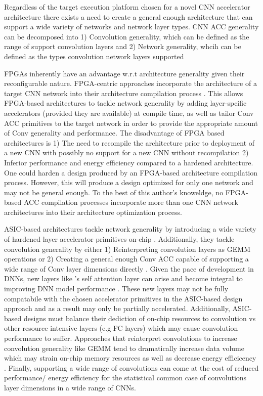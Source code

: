 Regardless of the target execution platform chosen for a novel \ac{CNN}
accelerator architecture there exists a need to create a general enough
architecture that can support a wide variety of networks and network layer
types. \ac{CNN} \ac{ACC} generality can be decomposed into 1) Convolution
generality, which can be defined as the range of support convolution layers and
2) Network generality, whcih can be defined as the types convolution network
layers supported 

\ac{FPGA}s inherently have an advantage w.r.t architecture generality given
their reconfigurable nature. \ac{FPGA}-centric approaches incorporate the
architecture of a target \ac{CNN} network into their architecture compilation
process \cite{caffeine}. This allows \ac{FPGA}-based architectures to tackle
network generality by adding layer-spcific accelerators (provided they are
available) at compile time, as well as tailor \ac{Conv} \ac{ACC} primitives to
the target network in order to provide the appropriate amount of \ac{Conv}
generality and performance. The disadvantage of \ac{FPGA} based architectures is
1) The need to recompile the architecture prior to deployment of a new \ac{CNN}
with possibly no support for a new \ac{CNN} without recompilation 2) Inferior performance and energy
efficiency compared to a hardened architecture. One could harden a design
produced by an \ac{FPGA}-based architecture compilation process. However, this
will produce a design optimized for only one network and may not be general
enough. To the best of this author's knoweldge, no \ac{FPGA}-based \ac{ACC}
compilation processes incorporate more than one \ac{CNN} network architectures
into their architecture optimization process. 

\ac{ASIC}-based architectures tackle network generality by introducing a wide
variety of hardened layer accelerator primitives on-chip \cite{tpu}.
Additionally, they tackle convolution generality by either 1) Reinterpreting
convolution layers as \ac{GEMM} operations or 2) Creating a general
enough \ac{Conv} \ac{ACC} capable of supporting a wide range of \ac{Conv} layer
dimensions directly \cite{eyerissv2}. Given the pace of development in \ac{DNN}s,
new layers like \cite{transformer_model}'s self attention layer can
arise and become integral to improving \ac{DNN} model performance
\cite{conv_and_transformers}. These new layers may not be fully compatabile with
the chosen accelerator primitives in the \ac{ASIC}-based design approach and as
a result may only be partially accelerated. Additionally, \ac{ASIC}-based
designs must balance their dediction of on-chip resources to convolution vs
other resource intensive layers (e.g \ac{FC} layers) which may cause convolution
performance to suffer. Approaches that reinterpret convolutions to increase
convolution generality like \ac{GEMM} tend to dramatically increase data volume
which may strain on-chip memory resources as well as decrease energy efficicency
\cite{caffeine}. Finally, supporting a wide range of convolutions can come at
the cost of reduced performance/ energy efficiency for the statistical common
case of convolutions layer dimensions in a wide range of \ac{CNN}s.  


